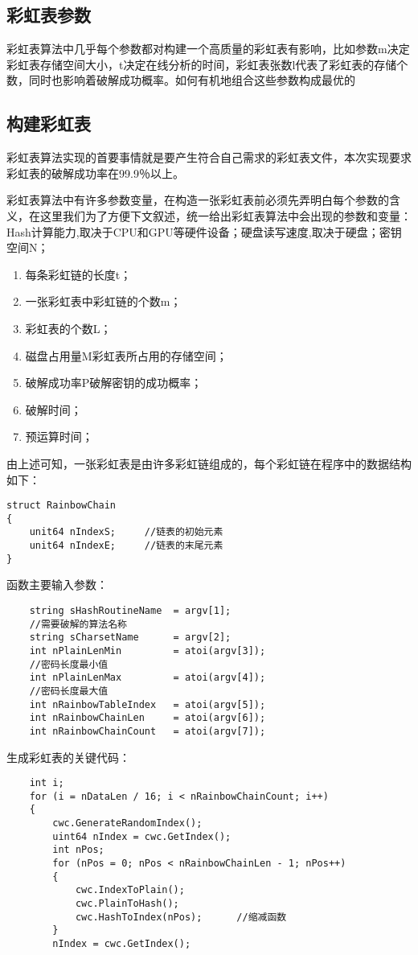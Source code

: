 \subsection{彩虹表参数}
彩虹表算法中几乎每个参数都对构建一个高质量的彩虹表有影响，比如参数m决定彩虹表存储空间大小，t决定在线分析的时间，彩虹表张数l代表了彩虹表的存储个数，同时也影响着破解成功概率。如何有机地组合这些参数构成最优的
\subsection{构建彩虹表}
彩虹表算法实现的首要事情就是要产生符合自己需求的彩虹表文件，本次实现要求彩虹表的破解成功率在99.9％以上。

彩虹表算法中有许多参数变量，在构造一张彩虹表前必须先弄明白每个参数的含义，在这里我们为了方便下文叙述，统一给出彩虹表算法中会出现的参数和变量：Hash计算能力,取决于CPU和GPU等硬件设备；硬盘读写速度,取决于硬盘；密钥空间N；
\begin{enumerate}
\item 每条彩虹链的长度t；
\item 一张彩虹表中彩虹链的个数m；
\item 彩虹表的个数L；
\item 磁盘占用量M\quad 彩虹表所占用的存储空间；
\item 破解成功率P\quad 破解密钥的成功概率；
\item 破解时间；
\item 预运算时间；
\end{enumerate}
由上述可知，一张彩虹表是由许多彩虹链组成的，每个彩虹链在程序中的数据结构如下：\\
\begin{lstlisting}
struct RainbowChain 
{
	unit64 nIndexS;		//链表的初始元素
	unit64 nIndexE;		//链表的末尾元素
}
\end{lstlisting}
函数主要输入参数：
\begin{lstlisting}
	string sHashRoutineName  = argv[1];	
	//需要破解的算法名称
	string sCharsetName      = argv[2];				
	int nPlainLenMin         = atoi(argv[3]);
	//密码长度最小值
	int nPlainLenMax         = atoi(argv[4]);
	//密码长度最大值
	int nRainbowTableIndex   = atoi(argv[5]);			
	int nRainbowChainLen     = atoi(argv[6]);			
	int nRainbowChainCount   = atoi(argv[7]);			
\end{lstlisting}
生成彩虹表的关键代码：
\begin{lstlisting}
	int i;
	for (i = nDataLen / 16; i < nRainbowChainCount; i++) 
	{
		cwc.GenerateRandomIndex();
		uint64 nIndex = cwc.GetIndex();
		int nPos;
		for (nPos = 0; nPos < nRainbowChainLen - 1; nPos++)
		{
			cwc.IndexToPlain();
			cwc.PlainToHash();
			cwc.HashToIndex(nPos);		//缩减函数
		}
		nIndex = cwc.GetIndex();

\end{lstlisting}

